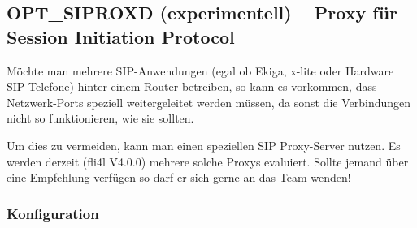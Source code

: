 \subsection{OPT\_SIPROXD (experimentell) -- Proxy für Session Initiation Protocol}

Möchte man mehrere SIP-Anwendungen (egal ob Ekiga, x-lite oder Hardware
SIP-Telefone) hinter einem Router betreiben, so kann es vorkommen,
dass Netzwerk-Ports speziell weitergeleitet werden müssen, da sonst
die Verbindungen nicht so funktionieren, wie sie sollten.

Um dies zu vermeiden, kann man einen speziellen SIP Proxy-Server nutzen.
Es werden derzeit (fli4l V4.0.0) mehrere solche Proxys evaluiert.
Sollte jemand über eine Empfehlung verfügen so darf er sich gerne
an das Team wenden!


\subsubsection{Konfiguration}

